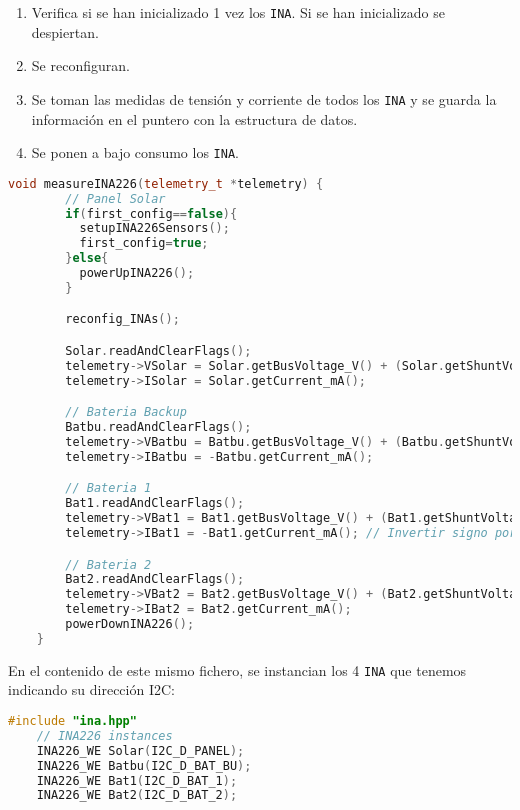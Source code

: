 \begin{enumerate}
    \item Verifica si se han inicializado 1 vez los \texttt{INA}. Si se han inicializado se despiertan.
    \item Se reconfiguran.
    \item Se toman las medidas de tensión y corriente de todos los \texttt{INA} y se guarda la información en el puntero con la estructura de datos.
    \item Se ponen a bajo consumo los \texttt{INA}.
\end{enumerate}

\begin{lstlisting}[captionpos=b, caption={Codigo funcion measureINA226}, language=c++]
    void measureINA226(telemetry_t *telemetry) {
        // Panel Solar
        if(first_config==false){
          setupINA226Sensors();
          first_config=true;
        }else{
          powerUpINA226();
        }

        reconfig_INAs();

        Solar.readAndClearFlags();
        telemetry->VSolar = Solar.getBusVoltage_V() + (Solar.getShuntVoltage_mV() / 100);
        telemetry->ISolar = Solar.getCurrent_mA();

        // Bateria Backup
        Batbu.readAndClearFlags();
        telemetry->VBatbu = Batbu.getBusVoltage_V() + (Batbu.getShuntVoltage_mV() / 100);
        telemetry->IBatbu = -Batbu.getCurrent_mA();

        // Bateria 1
        Bat1.readAndClearFlags();
        telemetry->VBat1 = Bat1.getBusVoltage_V() + (Bat1.getShuntVoltage_mV() / 100);
        telemetry->IBat1 = -Bat1.getCurrent_mA(); // Invertir signo porque esta al reves

        // Bateria 2
        Bat2.readAndClearFlags();
        telemetry->VBat2 = Bat2.getBusVoltage_V() + (Bat2.getShuntVoltage_mV() / 100);
        telemetry->IBat2 = Bat2.getCurrent_mA();
        powerDownINA226();
    }
\end{lstlisting}


En el contenido de este mismo fichero, se instancian los 4 \texttt{INA} que tenemos indicando su dirección I2C:

\begin{lstlisting}[captionpos=b, caption={Instancia de las direcciones de los \texttt{INA}.}, language=c++]
    #include "ina.hpp"
    // INA226 instances
    INA226_WE Solar(I2C_D_PANEL);
    INA226_WE Batbu(I2C_D_BAT_BU);
    INA226_WE Bat1(I2C_D_BAT_1);
    INA226_WE Bat2(I2C_D_BAT_2);

\end{lstlisting}

